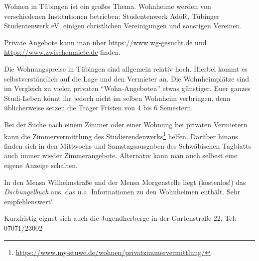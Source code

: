 Wohnen in Tübingen ist ein großes Thema.  Wohnheime werden von verschiedenen Institutionen betrieben: Studentenwerk AdöR, Tübinger Studentenwerk eV, einigen christlichen Vereinigungen und sonstigen Vereinen. 

Private Angebote kann man über \url{https://www.wg-gesucht.de} und \url{https://www.zwischenmiete.de} finden.

Die Wohnungspreise in Tübingen sind allgemein relativ hoch. Hierbei kommt es selbstverständlich auf die Lage und den Vermieter an. Die Wohnheimplätze sind im Vergleich zu vielen privaten "`Wohn-Angeboten"' etwas günstiger.  Euer ganzes Studi-Leben könnt ihr jedoch nicht im selben Wohnheim verbringen, denn üblicherweise setzen die Träger Fristen von 4 bis 6 Semestern.

Bei der Suche nach einem Zimmer oder einer Wohnung bei privaten Vermietern kann die Zimmervermittlung des Studierendenwerks\footnote{\url{https://www.my-stuwe.de/wohnen/privatzimmervermittlung/}} helfen. Darüber hinaus finden sich in den Mittwochs und Samstagsausgaben des Schwäbischen Tagblatts auch immer wieder Zimmerangebote. Alternativ kann man auch selbest eine eigene Anzeige schalten.

In den Mensa Wilhelmstraße und der Mensa Morgenstelle liegt (kostenlos!) das \emph{Dschungelbuch} aus, das u.a. Informationen zu den Wohnheimen enthält. Sehr empfehlenswert!

Kurzfristig eignet sich auch die Jugendherberge in der Gartenstraße 22, Tel: 07071/23002
